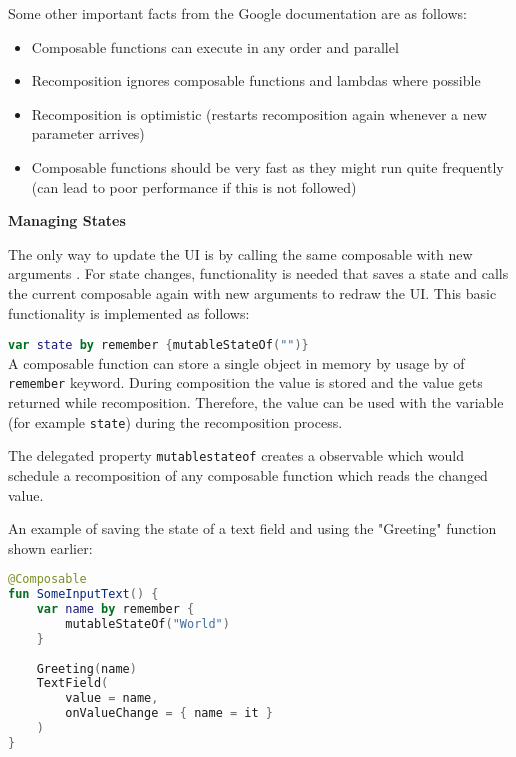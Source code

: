 \noindent
Some other important facts from the Google documentation \cite{android_thinking_in_compose} are as follows:
\begin{itemize}
    \item Composable functions can execute in any order and parallel
    \item Recomposition ignores composable functions and lambdas where possible
    \item Recomposition is optimistic (restarts recomposition again whenever a new parameter arrives)
    \item Composable functions should be very fast as they might run quite frequently (can lead to poor performance if this is not followed) \\
\end{itemize}

\noindent
\textbf{Managing States}

The only way to update the UI is by calling the same composable with new arguments \cite{android_state_compose}. For state changes, functionality is needed that saves a state and calls the current composable again with new arguments to redraw the UI. This basic functionality is implemented as follows:

\noindent
\lstinline[language=Kotlin]|var state by remember {mutableStateOf("")}| \\

A composable function can store a single object in memory by usage by of \lstinline[language=Kotlin]|remember| keyword. During composition the value is stored and the value gets returned while recomposition. Therefore, the value can be used with the variable (for example \lstinline[language=Kotlin]{state}) during the recomposition process.

The delegated property \lstinline[language=Kotlin]|mutablestateof| creates a observable which would schedule a recomposition of any composable function which reads the changed value. \cite{android_state_compose}

An example of saving the state of a text field and using the "Greeting" function shown earlier:

\begin{lstlisting}[language=Kotlin]
@Composable
fun SomeInputText() {
    var name by remember { 
        mutableStateOf("World") 
    }
    
    Greeting(name)
    TextField(
        value = name,
        onValueChange = { name = it }
    )
}
\end{lstlisting}

